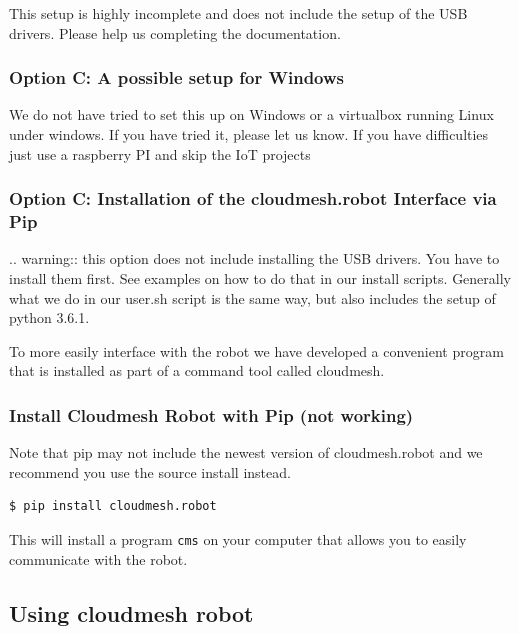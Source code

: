 This setup is highly incomplete and does not include the setup of the
USB drivers. Please help us completing the documentation.

\subsubsection{Option C: A possible setup for
Windows}\label{option-c-a-possible-setup-for-windows}

We do not have tried to set this up on Windows or a virtualbox running
Linux under windows. If you have tried it, please let us know. If you
have difficulties just use a raspberry PI and skip the IoT projects

\subsubsection{Option C: Installation of the cloudmesh.robot Interface
via
Pip}\label{option-c-installation-of-the-cloudmesh.robot-interface-via-pip}

.. warning:: this option does not include installing the USB drivers.
You have to install them first. See examples on how to do that in our
install scripts. Generally what we do in our user.sh script is the same
way, but also includes the setup of python 3.6.1.

To more easily interface with the robot we have developed a convenient
program that is installed as part of a command tool called cloudmesh.

\subsubsection{Install Cloudmesh Robot with Pip (not
working)}\label{install-cloudmesh-robot-with-pip-not-working}

Note that pip may not include the newest version of cloudmesh.robot and
we recommend you use the source install instead.

\begin{verbatim}
$ pip install cloudmesh.robot 
\end{verbatim}

This will install a program \texttt{cms} on your computer that allows
you to easily communicate with the robot.

\subsection{Using cloudmesh robot}\label{using-cloudmesh-robot}

